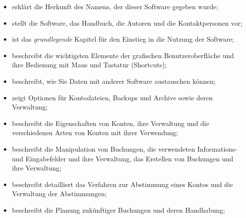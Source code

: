 \begin{itemize}
	\item {} erklärt die Herkunft des Namens, der dieser Software gegeben wurde;%
	\item {} stellt die Software, das Handbuch, die Autoren und die Kontaktpersonen vor;%
	\item {} ist das \emph{grundlegende} Kapitel für den Einstieg in die Nutzung der Software;%
	\item {} beschreibt die wichtigsten Elemente der grafischen Benutzeroberfläche und ihre Bedienung mit Maus und Tastatur (Shortcuts);%
	\item {} beschreibt, wie Sie Daten mit anderer Software austauschen können;%
	\item {} zeigt Optionen für Kontodateien, Backups und Archive sowie deren Verwaltung;%
	\item {} beschreibt die Eigenschaften von Konten, ihre Verwaltung und die verschiedenen Arten von Konten mit ihrer Verwendung;%
	\item {} beschreibt die Manipulation von Buchungen, die verwendeten Informations- und Eingabefelder und ihre Verwaltung, das Erstellen von Buchungen und ihre Verwaltung;%
	\item {} beschreibt detailliert das Verfahren zur Abstimmung eines Kontos und die Verwaltung der Abstimmungen;%
	\item {} beschreibt die Planung zukünftiger Buchungen und deren Handhabung;%

\end{itemize}
